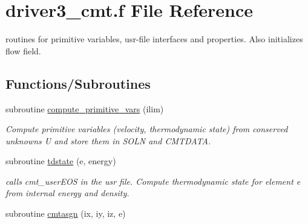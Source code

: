 \hypertarget{driver3__cmt_8f}{\section{driver3\-\_\-cmt.\-f File Reference}
\label{driver3__cmt_8f}
}


routines for primitive variables, usr-\/file interfaces and properties. Also initializes flow field.  


\subsection*{Functions/\-Subroutines}
\begin{DoxyCompactItemize}
\item 
subroutine \hyperlink{group__state_ga150496cc6bdf94171d8f6822cd697145}{compute\-\_\-primitive\-\_\-vars} (ilim)
\begin{DoxyCompactList}\small\item\em Compute primitive variables (velocity, thermodynamic state) from conserved unknowns U and store them in S\-O\-L\-N and C\-M\-T\-D\-A\-T\-A. \end{DoxyCompactList}\item 
subroutine \hyperlink{group__state_ga91fd597ad604e7412e8d78a79beefe34}{tdstate} (e, energy)
\begin{DoxyCompactList}\small\item\em calls cmt\-\_\-user\-E\-O\-S in the usr file. Compute thermodynamic state for element e from internal energy and density. \end{DoxyCompactList}\item 
\hypertarget{group__initialconds_ga0427858fb7b0c582bcd5ff776de86a09}{subroutine \hyperlink{group__initialconds_ga0427858fb7b0c582bcd5ff776de86a09}{cmtasgn} (ix, iy, iz, e)}\label{group__initialconds_ga0427858fb7b0c582bcd5ff776de86a09}


\end{DoxyCompactItemize}
